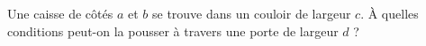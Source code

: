 Une caisse de côtés $a$ et $b$ se trouve dans un couloir de largeur $c$. À quelles conditions peut-on la pousser à travers une porte de largeur $d$ ?
